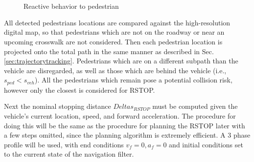 \documentclass[letterpaper, 10 pt, conference]{ieeeconf}  %
\begin{document}
\begin{figure}[thpb]
\centering
  \\
  \\
  \caption{Reactive behavior to pedestrian}
  \label{fig:react}
\end{figure}

All detected pedestrians locations are compared against the high-resolution digital map, so that pedestrians which are not on the roadway or near an upcoming crosswalk are not considered.
Then each pedestrian location is projected onto the total path in the same manner as described in Sec. \ref{sec:trajectorytracking}.
Pedestrians which are on a different subpath than the vehicle are disregarded, as well as those which are behind the vehicle (i.e., $s_{ped} < s_{veh}$).
All the pedestrians which remain pose a potential collision risk, however only the closest is considered for RSTOP.

Next the nominal stopping distance $Delta s_{RSTOP}$ must be computed given the vehicle's current location, speed, and forward acceleration.
The procedure for doing this will be the same as the procedure for planning the RSTOP later with a few steps omitted, since the planning algorithm is extremely efficient.
A 3 phase profile will be used, with end conditions $v_f=0, a_f=0$ and initial conditions set to the current state of the navigation filter.
\end{document}

